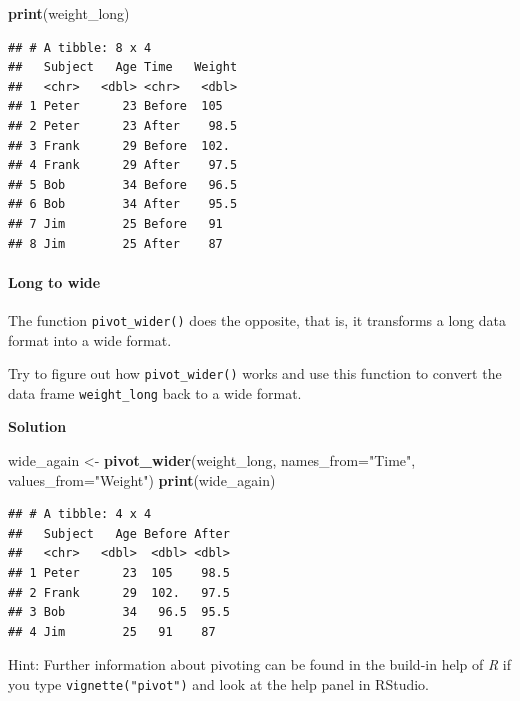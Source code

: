 \documentclass[
]{scrartcl}
\makeatletter
\newenvironment{Shaded}{\begin{snugshade}}{\end{snugshade}}
\newcommand{\AttributeTok}[1]{\textcolor[rgb]{0.13,0.29,0.53}{#1}}
\newcommand{\FunctionTok}[1]{\textcolor[rgb]{0.13,0.29,0.53}{\textbf{#1}}}
\newcommand{\NormalTok}[1]{#1}
\newcommand{\OtherTok}[1]{\textcolor[rgb]{0.56,0.35,0.01}{#1}}
\newcommand{\StringTok}[1]{\textcolor[rgb]{0.31,0.60,0.02}{#1}}
\newenvironment{kframe}{%
\medskip{}
\setlength{\fboxsep}{.8em}
 \def\at@end@of@kframe{}%
 \ifinner\ifhmode%
  \def\at@end@of@kframe{\end{minipage}}%
  \begin{minipage}{\columnwidth}%
 \fi\fi%
 \def\FrameCommand##1{\hskip\@totalleftmargin \hskip-\fboxsep
 \colorbox{shadecolor}{##1}\hskip-\fboxsep
     \hskip-\linewidth \hskip-\@totalleftmargin \hskip\columnwidth}%
 \MakeFramed {\advance\hsize-\width
   \@totalleftmargin\z@ \linewidth\hsize
   \@setminipage}}%
 {\par\unskip\endMakeFramed%
 \at@end@of@kframe}
\newenvironment{rmdblock}[1]
  {
  \begin{itemize}
  \renewcommand{\labelitemi}{
    \raisebox{-.7\height}[0pt][0pt]{
      {\setkeys{Gin}{width=3em,keepaspectratio}\texttt{[image: images/\#1]}}
    }
  }
  \setlength{\fboxsep}{1em}
  \begin{kframe}
  \item
  }
  {
  \end{kframe}
  \end{itemize}
  }
\newenvironment{myexercise}
    {\begin{rmdblock}{exercise_green}}
    {\end{rmdblock}}
\newenvironment{webexsolution}[1]
    {\par\tiny\textbf{#1}}
    {\par}
\newcommand{\webexhide}[1]{\begin{webexsolution}{#1}}
\newcommand{\webexunhide}{\end{webexsolution}}
\makeatother
\begin{document}
\begin{Shaded}
\begin{Highlighting}[]
\FunctionTok{print}\NormalTok{(weight\_long)}
\end{Highlighting}
\end{Shaded}

\begin{verbatim}
## # A tibble: 8 x 4
##   Subject   Age Time   Weight
##   <chr>   <dbl> <chr>   <dbl>
## 1 Peter      23 Before  105  
## 2 Peter      23 After    98.5
## 3 Frank      29 Before  102. 
## 4 Frank      29 After    97.5
## 5 Bob        34 Before   96.5
## 6 Bob        34 After    95.5
## 7 Jim        25 Before   91  
## 8 Jim        25 After    87
\end{verbatim}

\hypertarget{long-to-wide}{%
\paragraph*{Long to wide}\label{long-to-wide}}

The function \texttt{pivot\_wider()} does the opposite, that is, it transforms a long data format into a wide format.

\begin{myexercise}
Try to figure out how \texttt{pivot\_wider()} works and use this
function to convert the data frame \texttt{weight\_long} back to a wide
format.
\end{myexercise}
\webexhide{Solution}

\begin{Shaded}
\begin{Highlighting}[]
\NormalTok{wide\_again }\OtherTok{\textless{}{-}} \FunctionTok{pivot\_wider}\NormalTok{(weight\_long, }\AttributeTok{names\_from=}\StringTok{"Time"}\NormalTok{, }\AttributeTok{values\_from=}\StringTok{"Weight"}\NormalTok{)}
\FunctionTok{print}\NormalTok{(wide\_again)}
\end{Highlighting}
\end{Shaded}

\begin{verbatim}
## # A tibble: 4 x 4
##   Subject   Age Before After
##   <chr>   <dbl>  <dbl> <dbl>
## 1 Peter      23  105    98.5
## 2 Frank      29  102.   97.5
## 3 Bob        34   96.5  95.5
## 4 Jim        25   91    87
\end{verbatim}

\webexunhide

Hint: Further information about pivoting can be found in the build-in help of \emph{R} if you type \texttt{vignette("pivot")} and look at the help panel in RStudio.
\end{document}
